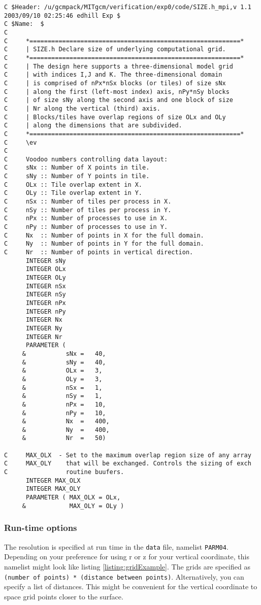 \documentclass[11pt]{article}
\begin{document}
\begin{lstlisting}[caption={Sample SIZE.h configuration file}, label={listing:SIZE.h}]
C $Header: /u/gcmpack/MITgcm/verification/exp0/code/SIZE.h_mpi,v 1.1 2003/09/10 02:25:46 edhill Exp $
C $Name:  $
C
C     *==========================================================*
C     | SIZE.h Declare size of underlying computational grid.
C     *==========================================================*
C     | The design here supports a three-dimensional model grid
C     | with indices I,J and K. The three-dimensional domain
C     | is comprised of nPx*nSx blocks (or tiles) of size sNx
C     | along the first (left-most index) axis, nPy*nSy blocks
C     | of size sNy along the second axis and one block of size
C     | Nr along the vertical (third) axis.
C     | Blocks/tiles have overlap regions of size OLx and OLy
C     | along the dimensions that are subdivided.
C     *==========================================================*
C     \ev
C
C     Voodoo numbers controlling data layout:
C     sNx :: Number of X points in tile.
C     sNy :: Number of Y points in tile.
C     OLx :: Tile overlap extent in X.
C     OLy :: Tile overlap extent in Y.
C     nSx :: Number of tiles per process in X.
C     nSy :: Number of tiles per process in Y.
C     nPx :: Number of processes to use in X.
C     nPy :: Number of processes to use in Y.
C     Nx  :: Number of points in X for the full domain.
C     Ny  :: Number of points in Y for the full domain.
C     Nr  :: Number of points in vertical direction.
      INTEGER sNy
      INTEGER OLx
      INTEGER OLy
      INTEGER nSx
      INTEGER nSy
      INTEGER nPx
      INTEGER nPy
      INTEGER Nx
      INTEGER Ny
      INTEGER Nr
      PARAMETER (
     &           sNx =   40,
     &           sNy =   40,
     &           OLx =   3,
     &           OLy =   3,
     &           nSx =   1,
     &           nSy =   1,
     &           nPx =   10,
     &           nPy =   10,
     &           Nx  =   400,
     &           Ny  =   400,
     &           Nr  =   50)

C     MAX_OLX  - Set to the maximum overlap region size of any array
C     MAX_OLY    that will be exchanged. Controls the sizing of exch
C                routine buufers.
      INTEGER MAX_OLX
      INTEGER MAX_OLY
      PARAMETER ( MAX_OLX = OLx,
     &            MAX_OLY = OLy )
\end{lstlisting}

\subsubsection*{Run-time options}
The resolution is specified at run time in the \verb|data| file, namelist \verb|PARM04|. Depending on your preference for using r or z for your vertical coordinate, this namelist might look like listing \ref{listing:gridExample}. The grids are specified as \verb| (number of points) * (distance between points)|. Alternatively, you can specify a list of distances. This might be convenient for the vertical coordinate to space grid points closer to the surface.
\end{document}

